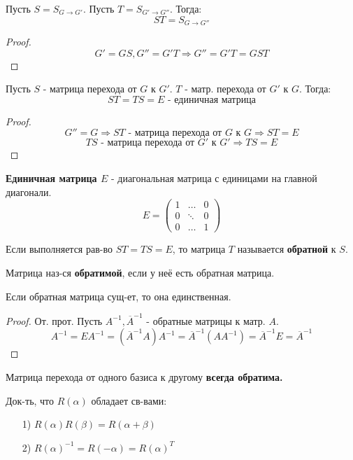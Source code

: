 \begin{statement}
    Пусть $S = S_{G\to G'}$. Пусть $T = S_{G'\to G''}$. Тогда:
    \[
    S T = S_{G \to G''}
    \] 
\end{statement}
\begin{proof}
\[
G' = GS, G'' = G'T \Rightarrow G'' = G'T = G ST
\] 
\end{proof}
\begin{statement}
    Пусть $S$ - матрица перехода от $G$ к $G'$. $T$ - матр. перехода от $G'$ к $G$. Тогда:
    \[
    ST = TS = E \text{ - единичная матрица}
    \] 
\end{statement}
\begin{proof}
    \[
    G'' = G \Rightarrow ST \text{ - матрица перехода от $G$ к $G$} \Rightarrow ST = E
    \] 
    \[
    TS \text{ - матрица перехода от $G'$ к $G'$} \Rightarrow TS = E
    \] 
\end{proof}
\begin{symb}
    \textbf{Единичная матрица $E$} - диагональная матрица с единицами на главной диагонали.
    \[
        E = \begin{pmatrix}1 & \ldots & 0 \\ 0 & \ddots & 0 \\ 0 & \ldots & 1 \end{pmatrix}
    \] 
\end{symb}
\begin{definition}
Если выполняется рав-во $ST = TS = E$, то матрица $T$ называется \textbf{обратной} к $S$.
\end{definition}
\begin{definition}
Матрица наз-ся \textbf{обратимой}, если у неё есть обратная матрица.
\end{definition}
\begin{statement}
Если обратная матрица сущ-ет, то она единственная.
\end{statement}
\begin{proof}
От. прот. Пусть $A^{-1}, \overline{A}^{-1}$ - обратные матрицы к матр. $A$.
\[
A^{-1} = E A^{-1} = (\overline{A}^{-1} A) A^{-1} = \overline{A}^{-1}(A A^{-1}) = \overline{A}^{-1}E = \overline{A}^{-1}
\] 
\end{proof}
\begin{consequence}
Матрица перехода от одного базиса к другому \textbf{всегда обратима.}
\end{consequence}
\begin{task}
Док-ть, что $R(\alpha)$ обладает св-вами:
\begin{itemize}
    \item [1) ]$R(\alpha) R(\beta) = R(\alpha + \beta)$
    \item [2) ] $R(\alpha)^{-1} = R(-\alpha) = R(\alpha)^{T}$
\end{itemize}
\end{task}
